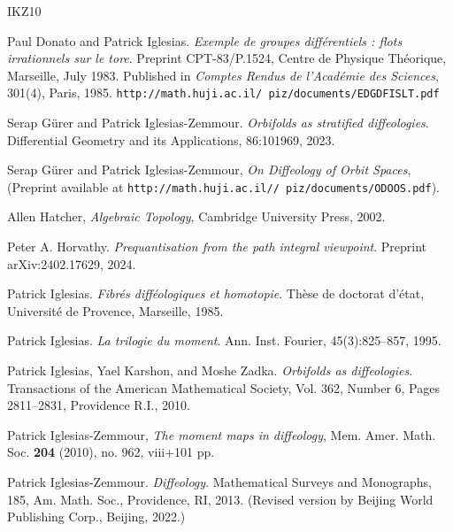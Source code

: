 \documentclass[11pt,reqno,letterpaper,twoside]{amsart}
\begin{document}
  
  
  \begin{thebibliography}{IKZ10} %
    
    Paul Donato and Patrick Iglesias.
    {\em Exemple de groupes diff\'erentiels : flots irrationnels sur le tore}.
    Preprint CPT-83/P.1524, Centre de Physique Th\'eorique, Marseille, July 1983. Published in {\em Comptes Rendus de l'Acad\'emie des Sciences}, 301(4), Paris, 1985.
    \texttt{http://math.huji.ac.il/~piz/documents/EDGDFISLT.pdf}
    
    Serap G{\"u}rer and Patrick Iglesias-Zemmour.
    {\em Orbifolds as stratified diffeologies}.
    {Differential Geometry and its Applications}, 86:101969, 2023.
    
    Serap Gürer and Patrick Iglesias-Zemmour,
    \emph{On Diffeology of Orbit Spaces},
    (Preprint available at \texttt{http://math.huji.ac.il//~piz/documents/ODOOS.pdf}).
    
    Allen Hatcher,
    \emph{Algebraic Topology},
    Cambridge University Press, 2002.
    
    Peter A. Horvathy.
    {\em Prequantisation from the path integral viewpoint}.
    Preprint arXiv:2402.17629, 2024.
    
    Patrick Iglesias.
    {\em Fibr\'es diff\'eologiques et homotopie}.
    Th\`ese de doctorat d'\'etat, Universit\'e de Provence, Marseille, 1985.
    
    Patrick Iglesias.
    {\em La trilogie du moment}.
    Ann. Inst. Fourier, 45(3):825--857, 1995.
    
    Patrick Iglesias, Yael Karshon, and Moshe Zadka.
    {\em Orbifolds as diffeologies}.
    Transactions of the American Mathematical Society, Vol. 362, Number 6, Pages 2811--2831, Providence R.I., 2010.
    
    Patrick Iglesias-Zemmour,
    \emph{The moment maps in diffeology},
    Mem. Amer. Math. Soc. \textbf{204} (2010), no. 962, viii+101 pp.
    
    Patrick Iglesias-Zemmour.
    {\em Diffeology}.
    Mathematical Surveys and Monographs, 185, Am. Math. Soc., Providence, RI, 2013.
    (Revised version by Beijing World Publishing Corp., Beijing, 2022.)
    

\end{thebibliography}
\end{document}
